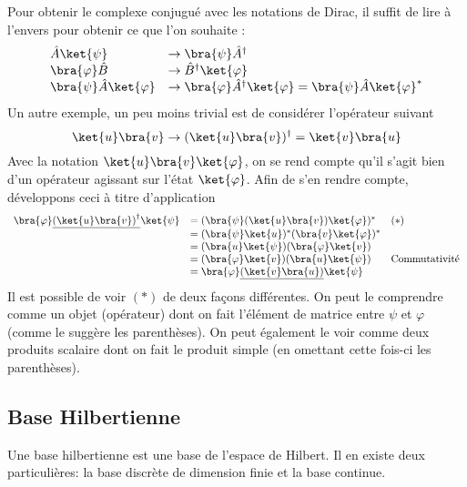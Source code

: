 Pour obtenir le complexe conjugué avec les notations de Dirac, il suffit de lire à 
l'envers pour obtenir ce que l'on souhaite :
\begin{equation}
\begin{array}{ll}
\hat{A}\ket{\psi} &\rightarrow \bra{\psi}\hat{A}^\dagger\\
\bra{\varphi}\hat{B}&\rightarrow \hat{B}^\dagger \ket{\varphi}\\
\bra{\psi}\hat{A}\ket{\varphi} &\rightarrow  \bra{\varphi}\hat{A}^\dagger\ket{\varphi} =
\bra{\psi}\hat{A}\ket{\varphi}^*
\end{array}
\end{equation}
Un autre exemple, un peu moins trivial est de considérer l'opérateur suivant
\begin{equation}
\ket{u}\bra{v} \rightarrow (\ket{u}\bra{v})^\dagger= \ket{v}\bra{u}
\end{equation}
Avec la notation $\ket{u}\bra{v}\ket{\varphi}$, on se rend 
compte qu'il s'agit bien d'un opérateur agissant sur l'état $\ket{\varphi}$. Afin de 
s'en rendre compte, développons ceci à titre d'application
\begin{equation}
\begin{array}{lll}
\bra{\varphi}\underline{\left(\ket{u}\bra{v}\right)^\dagger}\ket{\psi} &= (\bra{\psi}(\ket{u}\bra{v})
\ket{\varphi})^* & (*)\\
&=(\bra{\psi}\ket{u})^*(\bra{v}\ket{\varphi})^*\\
&=(\bra{u}\ket{\psi})(\bra{\varphi}\ket{v})\\
&=(\bra{\varphi}\ket{v})(\bra{u}\ket{\psi}) & \text{Commutativité}\\
&=\bra{\varphi}\underline{(\ket{v}\bra{u})}\ket{\psi}
\end{array}
\end{equation}
Il est possible de voir $(*)$ de deux façons différentes. On peut le comprendre comme 
un objet (opérateur) dont on fait l'élément de matrice entre $\psi$ et $\varphi$ (comme 
le suggère les parenthèses). On peut également le voir comme deux produits scalaire dont 
on fait le produit simple (en omettant cette fois-ci les parenthèses).


\subsection{Base Hilbertienne}
Une base hilbertienne est une base de l'espace de Hilbert. Il en existe deux particulières:
la base discrète de dimension finie et la base continue.

